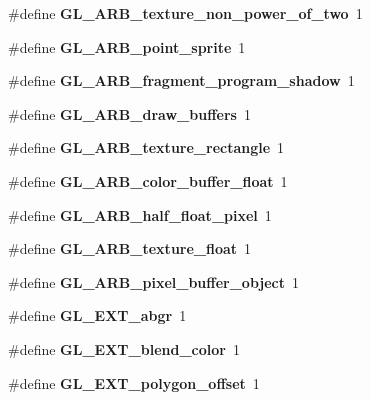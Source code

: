 \begin{DoxyCompactItemize}
\item 
\#define {\bfseries G\+L\+\_\+\+A\+R\+B\+\_\+texture\+\_\+non\+\_\+power\+\_\+of\+\_\+two}~1\label{_s_d_l__opengl_8h_a5f895aaa09e48f3a6ba6519ed5f4d378}

\item 
\#define {\bfseries G\+L\+\_\+\+A\+R\+B\+\_\+point\+\_\+sprite}~1\label{_s_d_l__opengl_8h_a53c358b0ed41ead6278cebab2b95d78f}

\item 
\#define {\bfseries G\+L\+\_\+\+A\+R\+B\+\_\+fragment\+\_\+program\+\_\+shadow}~1\label{_s_d_l__opengl_8h_a633fe63037b0146a33772ca76c784bc5}

\item 
\#define {\bfseries G\+L\+\_\+\+A\+R\+B\+\_\+draw\+\_\+buffers}~1\label{_s_d_l__opengl_8h_a7dd126744746bfa7de287cc0af950aec}

\item 
\#define {\bfseries G\+L\+\_\+\+A\+R\+B\+\_\+texture\+\_\+rectangle}~1\label{_s_d_l__opengl_8h_ab4337865034c450613e9f64a4a93f3ba}

\item 
\#define {\bfseries G\+L\+\_\+\+A\+R\+B\+\_\+color\+\_\+buffer\+\_\+float}~1\label{_s_d_l__opengl_8h_a38e73521b5b547c1448c33549a1eba5d}

\item 
\#define {\bfseries G\+L\+\_\+\+A\+R\+B\+\_\+half\+\_\+float\+\_\+pixel}~1\label{_s_d_l__opengl_8h_a4e91f621aef441919bb51654bb2f0a69}

\item 
\#define {\bfseries G\+L\+\_\+\+A\+R\+B\+\_\+texture\+\_\+float}~1\label{_s_d_l__opengl_8h_ac3e948a54c5ae85169ec08c3a3a5b49c}

\item 
\#define {\bfseries G\+L\+\_\+\+A\+R\+B\+\_\+pixel\+\_\+buffer\+\_\+object}~1\label{_s_d_l__opengl_8h_a38b496275aa12602b8ad063104d117b0}

\item 
\#define {\bfseries G\+L\+\_\+\+E\+X\+T\+\_\+abgr}~1\label{_s_d_l__opengl_8h_a5c0113fc017a20aa98c7dd09e5c6b651}

\item 
\#define {\bfseries G\+L\+\_\+\+E\+X\+T\+\_\+blend\+\_\+color}~1\label{_s_d_l__opengl_8h_ae52dcf5d32b30bca495c34ead9b66c1d}

\item 
\#define {\bfseries G\+L\+\_\+\+E\+X\+T\+\_\+polygon\+\_\+offset}~1\label{_s_d_l__opengl_8h_ad3e3822d73d2b10a577dcae3aacf8f38}


\end{DoxyCompactItemize}
